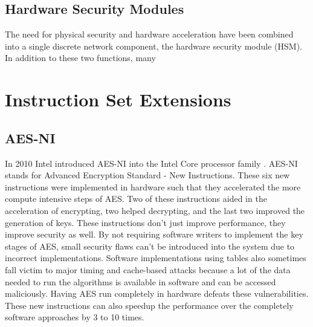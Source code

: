 \documentclass[journal]{IEEEtran}
\begin{document}
\subsection{Hardware Security Modules}

The need for physical security and hardware acceleration have been combined into a single discrete network component, the hardware security module (HSM).  In addition to these two functions, many 

\section{Instruction Set Extensions}

\subsection{AES-NI}

In 2010 Intel introduced AES-NI into the Intel Core processor family \cite{AES1} \cite{AES2}.  AES-NI stands for Advanced Encryption Standard - New Instructions.  These six new instructions were implemented in hardware such that they accelerated the more compute intensive steps of AES.  Two of these instructions aided in the acceleration of encrypting, two helped decrypting, and the last two improved the generation of keys.  These instructions don't just improve performance, they improve security as well.  By not requiring software writers to implement the key stages of AES, small security flaws can't be introduced into the system due to incorrect implementations.  Software implementations using tables also sometimes fall victim to major timing and cache-based attacks because a lot of the data needed to run the algorithms is available in software and can be accessed maliciously.  Having AES run completely in hardware defeats these vulnerabilities. These new instructions can also speedup the performance over the completely software approaches by 3 to 10 times.

%
%
\end{document}
